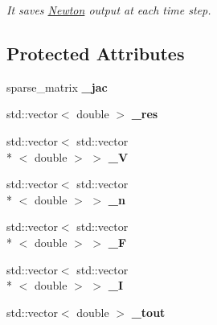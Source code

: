 \begin{DoxyCompactItemize}
\begin{DoxyCompactList}\small\item\em It saves \hyperlink{classNewton}{Newton} output at each time step. \end{DoxyCompactList}\end{DoxyCompactItemize}
\subsection*{Protected Attributes}
\begin{DoxyCompactItemize}
\item 
\hypertarget{classNewton_af8ee1b129171e42c3f1fa890022e56db}{sparse\-\_\-matrix {\bfseries \-\_\-jac}}\label{classNewton_af8ee1b129171e42c3f1fa890022e56db}

\item 
\hypertarget{classNewton_a80897aab25e8620d6a5c066cc5af7176}{std\-::vector$<$ double $>$ {\bfseries \-\_\-res}}\label{classNewton_a80897aab25e8620d6a5c066cc5af7176}

\item 
\hypertarget{classNewton_aeaee1b74d9938b9132107888cd72ff6a}{std\-::vector$<$ std\-::vector\\*
$<$ double $>$ $>$ {\bfseries \-\_\-\-V}}\label{classNewton_aeaee1b74d9938b9132107888cd72ff6a}

\item 
\hypertarget{classNewton_adbaf82971df668c7ba6bda452e246adf}{std\-::vector$<$ std\-::vector\\*
$<$ double $>$ $>$ {\bfseries \-\_\-n}}\label{classNewton_adbaf82971df668c7ba6bda452e246adf}

\item 
\hypertarget{classNewton_a9d7bc147290b76d0c7fb9ab17ab9ef3b}{std\-::vector$<$ std\-::vector\\*
$<$ double $>$ $>$ {\bfseries \-\_\-\-F}}\label{classNewton_a9d7bc147290b76d0c7fb9ab17ab9ef3b}

\item 
\hypertarget{classNewton_a040ca1b14f9d083d741e436d9ff91511}{std\-::vector$<$ std\-::vector\\*
$<$ double $>$ $>$ {\bfseries \-\_\-\-I}}\label{classNewton_a040ca1b14f9d083d741e436d9ff91511}

\item 
\hypertarget{classNewton_a57206ab66ec51c0515036eec7299dbdf}{std\-::vector$<$ double $>$ {\bfseries \-\_\-tout}}\label{classNewton_a57206ab66ec51c0515036eec7299dbdf}

\end{DoxyCompactItemize}


